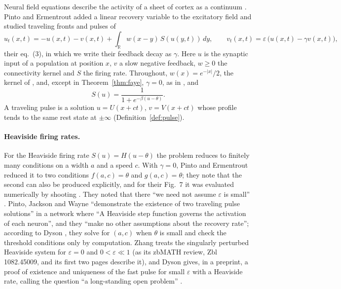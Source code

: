 \documentclass[11pt]{article}
\theoremstyle{definition}
\newcommand{\R}{\mathbb{R}}
\newcommand{\eps}{\varepsilon}
\begin{document}
Neural field equations describe the activity of a sheet of cortex as a continuum \cite{amari1977,bressloff2012}. Pinto and Ermentrout \cite{pe2001} added a linear recovery variable to the excitatory field and studied traveling fronts and pulses of
\begin{equation}\label{eq:field}
  u_t(x, t) = -u(x, t) - v(x, t) + \int_\R w(x - y)\, S(u(y, t))\, dy, \qquad v_t(x, t) = \eps\,\bigl(u(x, t) - \gamma v(x, t)\bigr),
\end{equation}
their eq.~(3), in which we write their feedback decay as $\gamma$. Here $u$ is the synaptic input of a population at position $x$, $v$ a slow negative feedback, $w \ge 0$ the connectivity kernel and $S$ the firing rate. Throughout, $w(x) = e^{-|x|}/2$, the kernel of \cite[Sect.~3.1]{pe2001}, and, except in Theorem~\ref{thm:faye}, $\gamma = 0$, as in \cite[Sect.~3.1]{pe2001}, and
\begin{equation}\label{eq:S}
  S(u) = \frac{1}{1 + e^{-\beta(u - \theta)}}.
\end{equation}
A traveling pulse is a solution $u = U(x + ct)$, $v = V(x + ct)$ whose profile tends to the same rest state at $\pm\infty$ (Definition~\ref{def:pulse}).

\paragraph{Heaviside firing rates.} For the Heaviside firing rate $S(u) = H(u - \theta)$ the problem reduces to finitely many conditions on a width $a$ and a speed $c$. With $\gamma = 0$, Pinto and Ermentrout reduced it to two conditions $f(a, c) = \theta$ and $g(a, c) = \theta$; they note that the second can also be produced explicitly, and for their Fig.~7 it was evaluated numerically by shooting \cite[p.~217 and Fig.~7]{pe2001}. They noted that there ``we need not assume $\eps$ is small'' \cite[Sect.~3.1, p.~215]{pe2001}. Pinto, Jackson and Wayne \cite[p.~954]{pjw2005} ``demonstrate the existence of two traveling pulse solutions'' in a network where ``A Heaviside step function governs the activation of each neuron'', and they ``make no other assumptions about the recovery rate''; according to Dyson \cite[pp.~7--8]{dyson2025}, they solve for $(a, c)$ when $\theta$ is small and check the threshold conditions only by computation. Zhang \cite{zhang2005} treats the singularly perturbed Heaviside system for $\eps = 0$ and $0 < \eps \ll 1$ (as its zbMATH review, Zbl 1082.45009, and its first two pages describe it), and Dyson gives, in a preprint, a proof of existence and uniqueness of the fast pulse for small $\eps$ with a Heaviside rate, calling the question ``a long-standing open problem'' \cite[abstract, p.~1]{dyson2025}.
\end{document}
